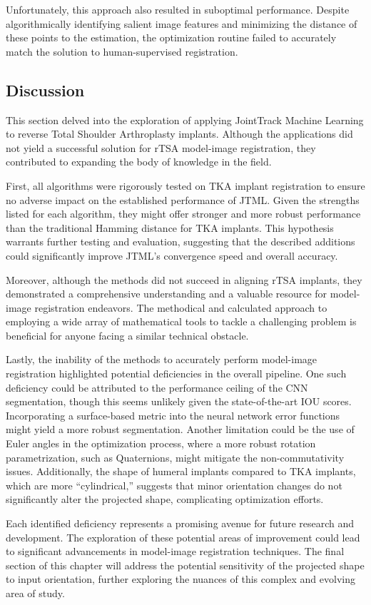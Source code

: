 Unfortunately, this approach also resulted in suboptimal performance.
Despite algorithmically identifying salient image features and minimizing the distance of these points to the estimation, the optimization routine failed to accurately match the solution to human-supervised registration.

\subsection{Discussion}
This section delved into the exploration of applying JointTrack Machine Learning to reverse Total Shoulder Arthroplasty implants.
Although the applications did not yield a successful solution for rTSA model-image registration, they contributed to expanding the body of knowledge in the field.

First, all algorithms were rigorously tested on TKA implant registration to ensure no adverse impact on the established performance of JTML.
Given the strengths listed for each algorithm, they might offer stronger and more robust performance than the traditional Hamming distance for TKA implants.
This hypothesis warrants further testing and evaluation, suggesting that the described additions could significantly improve JTML's convergence speed and overall accuracy.

Moreover, although the methods did not succeed in aligning rTSA implants, they demonstrated a comprehensive understanding and a valuable resource for model-image registration endeavors.
The methodical and calculated approach to employing a wide array of mathematical tools to tackle a challenging problem is beneficial for anyone facing a similar technical obstacle.

Lastly, the inability of the methods to accurately perform model-image registration highlighted potential deficiencies in the overall pipeline.
One such deficiency could be attributed to the performance ceiling of the CNN segmentation, though this seems unlikely given the state-of-the-art IOU scores.
Incorporating a surface-based metric into the neural network error functions might yield a more robust segmentation.
Another limitation could be the use of Euler angles in the optimization process, where a more robust rotation parametrization, such as Quaternions, might mitigate the non-commutativity issues.
Additionally, the shape of humeral implants compared to TKA implants, which are more ``cylindrical,'' suggests that minor orientation changes do not significantly alter the projected shape, complicating optimization efforts.

Each identified deficiency represents a promising avenue for future research and development.
The exploration of these potential areas of improvement could lead to significant advancements in model-image registration techniques.
The final section of this chapter will address the potential sensitivity of the projected shape to input orientation, further exploring the nuances of this complex and evolving area of study.



